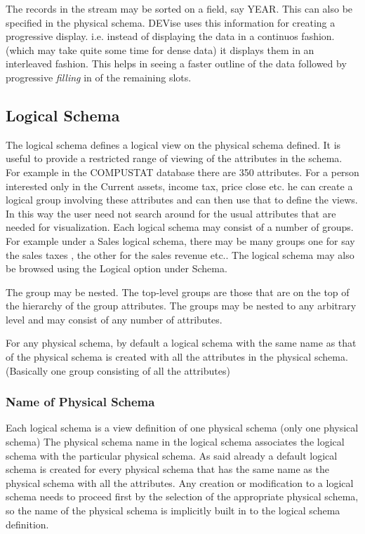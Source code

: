 The records in the stream may be sorted on a field, say YEAR. This can also be specified in the physical schema. DEVise uses this information for creating a progressive display. i.e. instead of displaying the data in a continuos fashion. (which may take quite some time for dense data) it displays them in an interleaved fashion. This helps in seeing a faster outline of the data followed by progressive {\em filling} in of the remaining slots.

\subsection{Logical Schema}

The logical schema defines a logical view on the physical schema defined. It is useful to provide a restricted range of viewing of the attributes in the schema. For example in the COMPUSTAT database there are 350 attributes. For a person interested only in the Current assets, income tax, price close etc. he can create a logical group involving these attributes and can then use that to define the views. In this way the user need not search around for the usual attributes that are needed for visualization. Each logical schema may consist of a number of groups. For example under a Sales logical schema, there may be many groups one for say the sales taxes , the other for the sales revenue etc.. The logical schema may also be browsed using the Logical option under Schema. 

The group may be nested. The top-level groups are those that are on the top of the hierarchy of the group attributes. The groups may be nested to any arbitrary level and may consist of any number of attributes.

For any physical schema, by default a logical schema with the same name as that of the physical schema is created with all the attributes in the physical schema.(Basically one group consisting of all the attributes) 

\subsubsection{Name of Physical Schema}

Each logical schema is a view definition of one physical schema (only one physical schema) The physical schema name in the logical schema associates the logical schema with the particular physical schema. As said already a default logical schema is created for every physical schema that has the same name as the physical schema with all the attributes. Any creation or modification to a logical schema needs to proceed first by the selection of the appropriate physical schema, so the name of the physical schema is implicitly built in to the logical schema definition.

